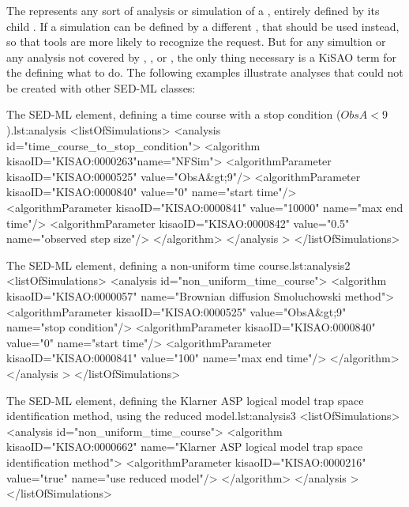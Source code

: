 \subsubsection{}
\label{class:analysis}
The  represents any sort of analysis or simulation of a \Model, entirely defined by its child \Algorithm.  If a simulation can be defined by a different \Simulation, that should be used instead, so that tools are more likely to recognize the request.  But for any simultion or any analysis not covered by \SteadyState, \OneStep, or \UniformTimeCourse, the only thing necessary is a KiSAO term for the \Algorithm defining what to do.  The following examples illustrate analyses that could not be created with other SED-ML \Simulation classes:


\begin{myXmlLst}{The SED-ML  element, defining a time course with a stop condition ($ObsA<9$).}{lst:analysis}
<listOfSimulations>
    <analysis id="time_course_to_stop_condition">
        <algorithm kisaoID="KISAO:0000263"name="NFSim">
            <algorithmParameter kisaoID="KISAO:0000525" value="ObsA&gt;9"/>
            <algorithmParameter kisaoID="KISAO:0000840" value="0" name="start time"/>
            <algorithmParameter kisaoID="KISAO:0000841" value="10000" name="max end time"/>
            <algorithmParameter kisaoID="KISAO:0000842" value="0.5" name="observed step size"/>
        </algorithm>
    </analysis >
</listOfSimulations>
\end{myXmlLst}


\begin{myXmlLst}{The SED-ML  element, defining a non-uniform time course.}{lst:analysis2}
<listOfSimulations>
    <analysis id="non_uniform_time_course">
        <algorithm kisaoID="KISAO:0000057" name="Brownian diffusion Smoluchowski method">
            <algorithmParameter kisaoID="KISAO:0000525" value="ObsA&gt;9" name="stop condition"/>
            <algorithmParameter kisaoID="KISAO:0000840" value="0" name="start time"/>
            <algorithmParameter kisaoID="KISAO:0000841" value="100" name="max end time"/>
        </algorithm>
    </analysis >
</listOfSimulations>
\end{myXmlLst}


\begin{myXmlLst}{The SED-ML  element, defining the Klarner ASP logical model trap space identification method, using the reduced model.}{lst:analysis3}
<listOfSimulations>
    <analysis id="non_uniform_time_course">
        <algorithm kisaoID="KISAO:0000662" name="Klarner ASP logical model trap space identification method">
            <algorithmParameter kisaoID="KISAO:0000216" value="true" name="use reduced model"/>
        </algorithm>
    </analysis >
</listOfSimulations>
\end{myXmlLst}





